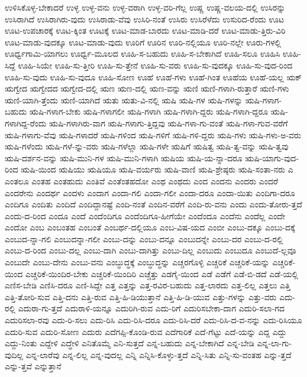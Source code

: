 {ಉಳಿಸಿಕೊಳ್ಳ-ಬೇಕಾದರೆ
ಉಳ್ಳ
ಉಳ್ಳ-ವನು
ಉಳ್ಳ-ವರಾಗಿ
ಉಳ್ಳ-ವರಿ-ಗೆಲ್ಲ
ಉಷ್ಣ
ಉಷ್ಣ-ವಲಯ-ದಲ್ಲಿ
ಉಸಿರನ್ನು
ಉಸಿರಾಗಿದೆ
ಉಸಿರಾಗಿರು-ವುದು
ಉಸಿರಾಡು-ವೆವು
ಉಸಿರಿ-ನಂತೆ
ಉಸಿರು
ಉಸಿರೆಳೆದು
ಉಸುರಿದ-ರೆಂದು
ಊಟ
ಊಟ-ಉಪಚಾರಕ್ಕೆ
ಊಟ-ಕ್ಕಿಂತ
ಊಟಕ್ಕೆ
ಊಟ-ಮಾಡ-ಬಾರದು
ಊಟ-ಮಾಡಿ-ದರೆ
ಊಟ-ಮಾಡು-ತ್ತಿರು-ವಿರಿ
ಊಟ-ಮಾಡು-ವುದಕ್ಕೂ
ಊಟ-ಮಾಡು-ವುದು
ಊರಿಗೆ
ಊರಿನ
ಊರಿ-ನಲ್ಲಿಯೂ
ಊರಿ-ನಲ್ಲೇ
ಊರು-ಗಳಲ್ಲಿ
ಊರ್ಧ್ವಗಾಮಿ-ಯಾಗಲು
ಊರ್ಧ್ವ-ಮೂಲದ
ಊಹಿ-ಸ-ಬಹುದು
ಊಹಿ-ಸ-ಬೇಕಾಗಿದೆ
ಊಹಿ-ಸಲೂ
ಊಹಿಸಿ
ಊಹಿ-ಸಿದ್ದೆ
ಊಹಿ-ಸಿಯೇ
ಊಹಿ-ಸು-ತ್ತೀರಿ
ಊಹಿ-ಸು-ತ್ತೇನೆ
ಊಹಿ-ಸು-ವರು
ಊಹಿ-ಸು-ವುದಕ್ಕೂ
ಊಹಿ-ಸು-ವುದ-ರಿಂದ
ಊಹಿ-ಸು-ವುದು
ಊಹಿ-ಸು-ವುದೂ
ಊಹಿ-ಸೋಣ
ಊಹೆ
ಊಹೆ-ಗಳು
ಊಹೆ-ಗಿಂತ
ಊಹೆಯ
ಊಹೆ-ಯಲ್ಲ
ಋಕ್
ಋಗ್ವೇದ
ಋಗ್ವೇದದ
ಋಗ್ವೇದ-ದಲ್ಲಿ
ಋಣ
ಋಣ-ದಲ್ಲಿ
ಋಣ-ವನ್ನು
ಋಣಿ
ಋಣಿ-ಗಳಾಗಿ-ರುತ್ತಾರೆ
ಋಣಿ-ಗಳು
ಋಣಿ-ಯಾಗಿ-ತ್ತೆಂದು
ಋಣಿ-ಯಾಗಿದೆ
ಋತು
ಋತು-ವಿ-ನಲ್ಲಿ
ಋಷಿ
ಋಷಿ-ಗಳ
ಋಷಿ-ಗಳನ್ನು
ಋಷಿ-ಗಳಾಗ-ಬಹುದು
ಋಷಿ-ಗಳಾಗ-ಬೇಕು
ಋಷಿ-ಗಳಾಗಲೀ
ಋಷಿ-ಗಳಾಗಿ
ಋಷಿ-ಗಳಾಗಿ-ದ್ದರು
ಋಷಿ-ಗಳಾಗಿ-ದ್ದರೂ
ಋಷಿ-ಗಳಾಗಿದ್ದ-ರೆಂದು
ಋಷಿ-ಗಳಾಗಿರು-ವಾಗ
ಋಷಿ-ಗಳಾಗು-ತ್ತಿದ್ದವು
ಋಷಿ-ಗಳಾ-ಗು-ವಂತೆ
ಋಷಿ-ಗಳಾ-ಗುವ-ವರೆಗೆ
ಋಷಿ-ಗಳಾಗು-ವೆವು
ಋಷಿ-ಗಳಾದರೆ
ಋಷಿ-ಗಳಿಂದ
ಋಷಿ-ಗಳಿಗೆ
ಋಷಿ-ಗಳಿ-ದ್ದರು
ಋಷಿ-ಗಳು
ಋಷಿ-ಗಳು-ಅ-ವರು
ಋಷಿ-ಗಳೆಂದು
ಋಷಿ-ಗಳೆ-ನ್ನು-ವರು
ಋಷಿ-ಗಳೆಲ್ಲಾ
ಋಷಿ-ಗಳೇ
ಋಷಿಗೆ
ಋಷಿತ್ವ
ಋಷಿ-ತ್ವ-ವನ್ನು
ಋಷಿ-ತ್ವವು
ಋಷಿ-ದರ್ಶನ-ವನ್ನು
ಋಷಿ-ಮುನಿ-ಗಳ
ಋಷಿ-ಮುನಿ-ಗಳಾಗಿ
ಋಷಿಯ
ಋಷಿ-ಯ-ನ್ನಾ-ದರೂ
ಋಷಿ-ಯಾಗು-ವುದ-ರಿಂದ
ಋಷಿ-ಯಿಂದ
ಋಷಿಯು
ಋಷಿಯೂ
ಋಷಿ-ವರ್ಯರು
ಋಷಿ-ವಾಣಿ
ಋಷಿ-ಶ್ರೇಷ್ಠರು
ಋಷಿ-ಸಂತಾ-ನರು
ಎ
ಎಂತಲೂ
ಎಂತಹ
ಎಂತಹುದು
ಎಂತಿವೆ
ಎಂತೆಂತಹದೋ
ಎಂಥ
ಎಂಥದು
ಎಂದ
ಎಂದನು
ಎಂದರು
ಎಂದರೆ
ಎಂದರೇನು
ಎಂದರ್ಥ
ಎಂದಳು
ಎಂದಾಗ
ಎಂದಾ-ಗಲಿ
ಎಂದಾ-ಗಲೀ
ಎಂದಾ-ದರೂ
ಎಂದಾ-ಯಿತು
ಎಂದಿಗಾ-ದರೂ
ಎಂದಿಗೂ
ಎಂದಿತು
ಎಂದಿದೆ
ಎಂದಿದ್ದಾನಷ್ಟೆ
ಎಂದಿ-ನಂತೆ
ಎಂದಿನ-ವರೆಗೆ
ಎಂದಿ-ರು-ವನು
ಎಂದು
ಎಂದು-ತೋರು-ತ್ತದೆ
ಎಂದು-ದ-ರಿಂದ
ಎಂದೂ
ಎಂದೆ
ಎಂದೆಂದಿಗೂ
ಎಂದೆಂದಿಗೂ-ಹೀಗೆಯೇ
ಎಂದೆಂದೂ
ಎಂದೆನು
ಎಂದೆಲ್ಲ
ಎಂದೇ
ಎಂದೋ
ಎಂಬ
ಎಂಬಂತಹ
ಎಂಬಂತೆ
ಎಂಬರ್ಥ-ದಲ್ಲಿಯೂ
ಎಂಬ-ವಿಷ-ಯದ
ಎಂಬೀ
ಎಂಬು-ದಕ್ಕೂ
ಎಂಬು-ದಕ್ಕೆ
ಎಂಬುದ-ನ್ನಾ-ಗಲಿ
ಎಂಬುದನ್ನಾ-ಗಲೀ
ಎಂಬು-ದನ್ನು
ಎಂಬು-ದನ್ನೂ
ಎಂಬುದನ್ನೇ
ಎಂಬು-ದರ
ಎಂಬು-ದ-ರಲ್ಲಿ
ಎಂಬು-ದ-ರಿಂದ
ಎಂಬು-ದಲ್ಲ
ಎಂಬು-ದಾಗಿ
ಎಂಬು-ದಾಗಿತ್ತು
ಎಂಬು-ದಿಲ್ಲ
ಎಂಬುದು
ಎಂಬುದೂ
ಎಂಬುದೆ-ಲ್ಲವೂ
ಎಂಬುದೇ
ಎಂಬು-ದೇನು
ಎಂಬು-ವನು
ಎಂಬ್ಧುದ್ಧಕ್ಕೆ
ಎಂಬ್ಧುದ್ಧನ್ನು
ಎಚ್ಚರಗೊಳ್ಳಿ
ಎಚ್ಚರಿಕೆ
ಎಚ್ಚರಿಕೆ-ಯನ್ನು
ಎಚ್ಚರಿಕೆ-ಯಿಂದ
ಎಚ್ಚರಿಕೆ-ಯಿಂದಿರ-ಬೇಕು
ಎಚ್ಚರಿಕೆ-ಯಿಂದಿರಿ
ಎಚ್ಚೆತ್ತು
ಎಡಗೈ-ಯಿಂದ
ಎಡೆ
ಎಡೆಗೆ
ಎಡೆ-ಬಿ-ಡದೆ
ಎಡೆ-ಯಲ್ಲಿ
ಎಣಿಸ-ಬೇಡಿ
ಎಣಿಸಿ-ದರೂ
ಎಣಿ-ಸಿದ್ದೇ
ಎತ್ತ
ಎತ್ತನ್ನು
ಎತ್ತ-ರವಿರ-ಬಹುದು
ಎತ್ತ-ಲಾರದು
ಎತ್ತ-ಲಿಲ್ಲ
ಎತ್ತಲು
ಎತ್ತಿ
ಎತ್ತಿ-ತೋರಿ-ಸುವ
ಎತ್ತಿ-ದನು
ಎತ್ತಿ-ರುವ
ಎತ್ತಿ-ಹಿ-ಡಿಯುತ್ತಾನೆ
ಎತ್ತಿ-ಹಿ-ಡಿ-ಯುವ
ಎತ್ತು-ಗಳನ್ನು
ಎತ್ತು-ವರು
ಎದು-ರಲ್ಲಿ
ಎದುರಾ-ಗು-ತ್ತದೆ
ಎದುರಾಳಿ-ಯನ್ನೂ
ಎದುರಿಗಿ-ರುವ
ಎದು-ರಿಗೆ
ಎದುರಿಸಬೇಕಾ-ದಾಗ
ಎದುರಿ-ಸಲಾ-ಗದ
ಎದುರಿಸಲಾ-ರವು
ಎದು-ರಿ-ಸಲು
ಎದು-ರಿಸಿ
ಎದು-ರಿಸಿ-ದರೂ
ಎದು-ರಿಸಿ-ದರೆ
ಎದು-ರಿಸಿ-ದ-ವ-ನನ್ನು
ಎದು-ರಿಸಿಯೂ
ಎದುರಿ-ಸುವ
ಎದುರಿ-ಸೋಣ
ಎದುರು
ಎದೆಗಪ್ಪಿ-ಕೊಂಡಿ-ರುವ
ಎದೆಗಾರಿಕೆ
ಎದೆ-ಗೆಟ್ಟು
ಎದೆ-ಯನ್ನು
ಎದ್ದ
ಎದ್ದು
ಎದ್ದು-ನಿಂತು
ಎದ್ದೇಳಿ
ಎದ್ಧೇಳಿ
ಎನಿತೊಮ್ಮೆ
ಎನಿ-ಸುತ್ತದೆ
ಎನ್ನ-ಬಹುದು
ಎನ್ನ-ಬೇಕಾಗಿದೆ
ಎನ್ನ-ಬೇಡಿ
ಎನ್ನ-ಲಾ-ಗು-ವುದಿಲ್ಲ
ಎನ್ನ-ಲಾರೆವು
ಎನ್ನ-ಲಿಲ್ಲ
ಎನ್ನ-ವುದಲ್ಲ
ಎನ್ನಿ
ಎನ್ನಿಸಿ-ಕೊಳ್ಳು-ತ್ತದೆ
ಎನ್ನಿ-ಸಿತು
ಎನ್ನಿ-ಸು-ವಂತಹ
ಎನ್ನು-ತ್ತದೆ
ಎನ್ನು-ತ್ತವೆ
ಎನ್ನುತ್ತಾನೆ
}

